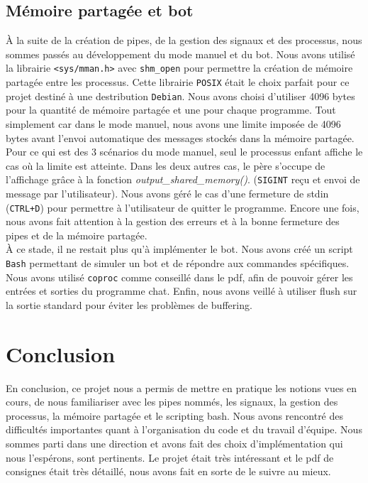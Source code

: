 \documentclass{article}
\begin{document}
\subsection{Mémoire partagée et bot}
\label{memoire-partagee-et-bot}


À la suite de la création de pipes, de la gestion des signaux et des processus, nous sommes passés au développement du mode manuel et du bot.
Nous avons utilisé la librairie \texttt{<sys/mman.h>} avec \texttt{shm\_open} pour permettre la création de mémoire partagée entre les processus. Cette librairie \texttt{POSIX} 
était le choix parfait pour ce projet destiné à une destribution \texttt{Debian}.
Nous avons choisi d'utiliser 4096 bytes pour la quantité de mémoire partagée et une pour chaque programme. 
Tout simplement car dans le mode manuel, nous avons une limite imposée de 4096 bytes avant l'envoi automatique des messages stockés dans la mémoire partagée.
Pour ce qui est des 3 scénarios du mode manuel, seul le processus enfant affiche le cas où la limite est atteinte.
Dans les deux autres cas, le père s'occupe de l'affichage grâce à la fonction \textit{output\_shared\_memory()}. (\texttt{SIGINT} reçu et envoi de message par l'utilisateur).
Nous avons géré le cas d'une fermeture de stdin (\texttt{CTRL+D}) pour permettre à l'utilisateur de quitter le programme.
Encore une fois, nous avons fait attention à la gestion des erreurs et à la bonne fermeture des pipes et de la mémoire partagée.\\

À ce stade, il ne restait plus qu'à implémenter le bot. Nous avons créé un script \texttt{Bash} permettant de simuler un bot et de répondre aux commandes spécifiques.
Nous avons utilisé \texttt{coproc} comme conseillé dans le pdf, afin de pouvoir gérer les entrées et sorties du programme chat.
Enfin, nous avons veillé à utiliser flush sur la sortie standard pour éviter les problèmes de buffering.



\section{Conclusion}
\label{conclusion}

En conclusion, ce projet nous a permis de mettre en pratique les notions vues en cours, de nous familiariser avec les pipes nommés, les signaux, la gestion des processus, la mémoire partagée et le scripting bash.
Nous avons rencontré des difficultés importantes quant à l'organisation du code et du travail d'équipe. Nous sommes parti dans une direction et avons fait des choix d'implémentation qui nous l'espérons, sont pertinents.
Le projet était très intéressant et le pdf de consignes était très détaillé, nous avons fait en sorte de le suivre au mieux.
\end{document}
